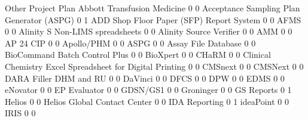 \documentclass{article}
\begin{document}
\begin{Schunk}
\begin{Soutput}
                                                            Other Project Plan
  Abbott Transfusion Medicine                                   0            0
  Acceptance Sampling Plan Generator (ASPG)                     0            1
  ADD Shop Floor Paper (SFP) Report System                      0            0
  AFMS                                                          0            0
  Alinity S Non-LIMS spreadsheets                               0            0
  Alinity Source Verifier                                       0            0
  AMM                                                           0            0
  AP 24 CIP                                                     0            0
  Apollo/PHM                                                    0            0
  ASPG                                                          0            0
  Assay File Database                                           0            0
  BioCommand Batch Control Plus                                 0            0
  BioXpert                                                      0            0
  CHaRM                                                         0            0
  Clinical Chemistry Excel Spreadsheet for Digital Printing     0            0
  CMSnext                                                       0            0
  CMSNext                                                       0            0
  DARA Filler DHM and RU                                        0            0
  DaVinci                                                       0            0
  DFCS                                                          0            0
  DPW                                                           0            0
  EDMS                                                          0            0
  eNovator                                                      0            0
  EP Evaluator                                                  0            0
  GDSN/GS1                                                      0            0
  Groninger                                                     0            0
  GS Reports                                                    0            1
  Helios                                                        0            0
  Helios Global Contact Center                                  0            0
  IDA Reporting                                                 0            1
  ideaPoint                                                     0            0
  IRIS                                                          0            0

\end{Soutput}
\end{Schunk}
\end{document}
